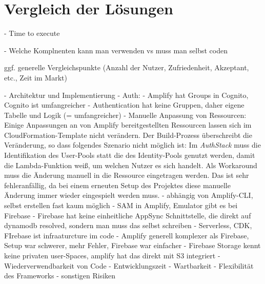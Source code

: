 \chapter{Vergleich der Lösungen}

- Time to execute

- Welche Komplnenten kann man verwenden vs muss man selbst coden

ggf. generelle Vergleichspunkte (Anzahl der Nutzer, Zufriedenheit, Akzeptant, etc., Zeit im Markt)

- Architektur und Implementierung
  - Auth:
    - Amplify hat Groups in Cognito, Cognito ist umfangreicher
    - Authentication hat keine Gruppen, daher eigene Tabelle und Logik (= umfangreicher)
  - Manuelle Anpassung von Ressourcen: Einige Anpassungen an von Amplify bereitgestellten Ressourcen lassen sich im CloudFormation-Template nicht verändern. Der Build-Prozess überschreibt die Veränderung, so dass folgendes Szenario nicht möglich ist: Im \textit{AuthStack} muss die Identifikation des User-Pools statt die des Identity-Pools genutzt werden, damit die Lambda-Funktion weiß, um welchen Nutzer es sich handelt. Als Workaround muss die Änderung manuell in die Ressource eingetragen werden. Das ist sehr fehleranfällig, da bei einem erneuten Setup des Projektes diese manuelle Änderung immer wieder eingespielt werden muss.
    - abhängig von Amplify-CLI, selbst erstellen fast kaum möglich
 - SAM in Amplify, Emulator gibt es bei Firebase
 - Firebase hat keine einheitliche AppSync Schnittstelle, die direkt auf dynamodb resolved, sondern man muss das selbst schreiben
 - Serverless, CDK, FIrebase ist infraaturcture im code
 - Amplify generell komplexer als Firebase, Setup war schwerer, mehr Fehler, Firebase war einfacher
 - Firebase Storage kennt keine privaten user-Spaces, amplify hat das direkt mit S3 integriert
- Wiederverwendbarkeit von Code
- Entwicklungszeit
- Wartbarkeit
- Flexibilität des Frameworks
- sonstigen Risiken